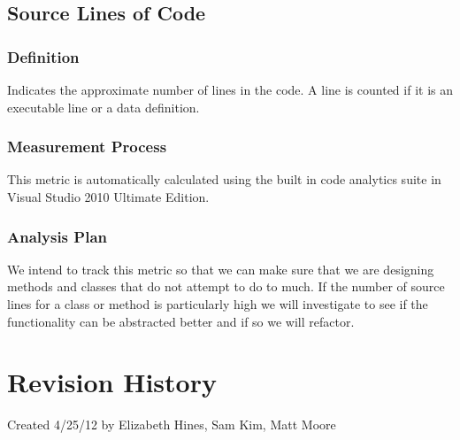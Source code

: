 \documentclass[12pt]{article}
\begin{document}
\subsection{Source Lines of Code}
\subsubsection{Definition}
 Indicates the approximate number of lines in the code. A line is counted if it is an executable line or a data definition.

\subsubsection{Measurement Process}
This metric is automatically calculated using the built in code analytics suite in Visual Studio 2010 Ultimate Edition.

\subsubsection{Analysis Plan}
We intend to track this metric so that we can make sure that we are designing methods and classes that do not attempt to do to much. If the number of source lines for a class or method is particularly high we will investigate to see if the functionality can be abstracted better and if so we will refactor.

\newpage
\section{Revision History}
Created 4/25/12 by Elizabeth Hines, Sam Kim, Matt Moore
\end{document}
